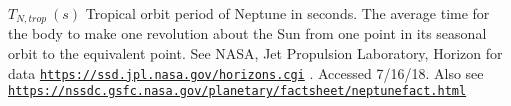 $ T_{N,trop} \ (s)$ Tropical orbit period of Neptune in seconds. The average time for the body to make one revolution about the Sun from one point in its seasonal orbit to the equivalent point. See N\+A\+SA, Jet Propulsion Laboratory, Horizon for data \href{https://ssd.jpl.nasa.gov/horizons.cgi}{\tt https\+://ssd.\+jpl.\+nasa.\+gov/horizons.\+cgi} . Accessed 7/16/18. Also see \href{https://nssdc.gsfc.nasa.gov/planetary/factsheet/neptunefact.html}{\tt https\+://nssdc.\+gsfc.\+nasa.\+gov/planetary/factsheet/neptunefact.\+html} 